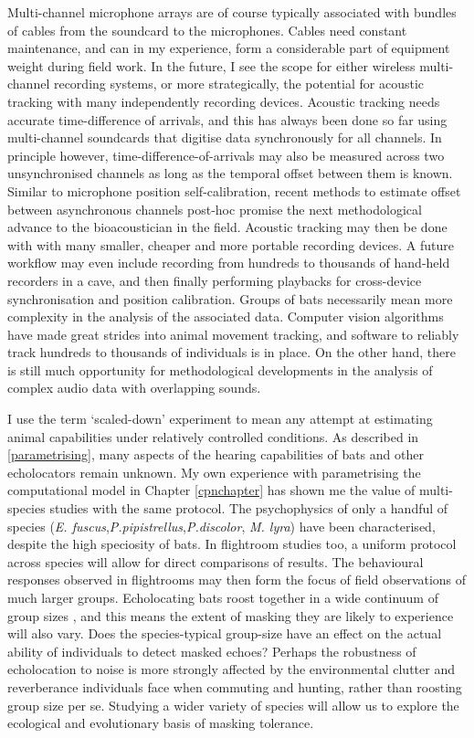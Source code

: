 \documentclass[
]{book}
\begin{document}
Multi-channel microphone arrays are of course typically associated with bundles of cables from the soundcard to the microphones. Cables need constant maintenance, and can in my experience, form a considerable part of equipment weight during field work. In the future, I see the scope for either wireless multi-channel recording systems, or more strategically, the potential for acoustic tracking with many independently recording devices. Acoustic tracking needs accurate time-difference of arrivals, and this has always been done so far using multi-channel soundcards that digitise data synchronously for all channels. In principle however, time-difference-of-arrivals may also be measured across two unsynchronised channels as long as the temporal offset between them is known. Similar to microphone position self-calibration, recent methods to estimate offset between asynchronous channels post-hoc \citep{burgess2012node, burgess2013minimal} promise the next methodological advance to the bioacoustician in the field. Acoustic tracking may then be done with with many smaller, cheaper and more portable recording devices. A future workflow may even include recording from hundreds to thousands of hand-held recorders in a cave, and then finally performing playbacks for cross-device synchronisation and position calibration. Groups of bats necessarily mean more complexity in the analysis of the associated data. Computer vision algorithms have made great strides into animal movement tracking, and software to reliably track hundreds to thousands of individuals is in place. On the other hand, there is still much opportunity for methodological developments in the analysis of complex audio data with overlapping sounds.

I use the term `scaled-down' experiment to mean any attempt at estimating animal capabilities under relatively controlled conditions. As described in \ref{parametrising}, many aspects of the hearing capabilities of bats and other echolocators remain unknown. My own experience with parametrising the computational model in Chapter \ref{cpnchapter} has shown me the value of multi-species studies with the same protocol. The psychophysics of only a handful of species (\emph{E. fuscus},\emph{P.pipistrellus},\emph{P.discolor}, \emph{M. lyra}) have been characterised, despite the high speciosity of bats. In flightroom studies too, a uniform protocol across species will allow for direct comparisons of results. The behavioural responses observed in flightrooms may then form the focus of field observations of much larger groups. Echolocating bats roost together in a wide continuum of group sizes \citep{kunz1982a}, and this means the extent of masking they are likely to experience will also vary. Does the species-typical group-size have an effect on the actual ability of individuals to detect masked echoes? Perhaps the robustness of echolocation to noise is more strongly affected by the environmental clutter and reverberance individuals face when commuting and hunting, rather than roosting group size per se. Studying a wider variety of species will allow us to explore the ecological and evolutionary basis of masking tolerance.
\end{document}

